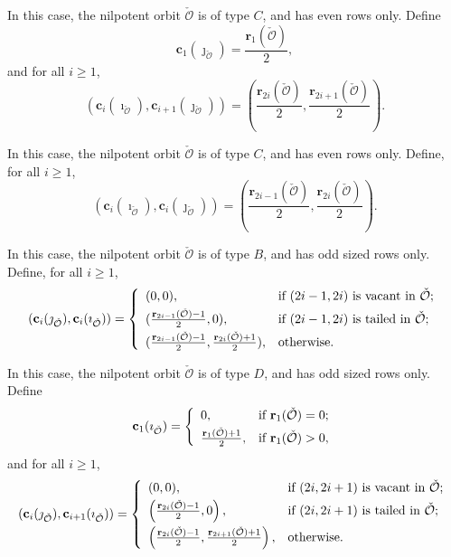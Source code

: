 \documentclass[11pt,a4paper]{amsart}
\newcommand{\CO}{{\mathcal {O}}}
\numberwithin{equation}{section}
\theoremstyle{remark}
\begin{document}
\medskip

 In this case, the nilpotent orbit $\check \CO$ is of type $C$, and has even rows
  only. Define
 \[
   \mathbf c_{1}(\jmath_{\check \CO})=\frac{\mathbf r_1(\check \CO)}{2},
\]
and for all $i\geq 1$,
\[
\left (\mathbf c_{i}(\imath_{\check \CO}), \mathbf c_{i+1}(\jmath_{\check \CO})\right )=
            \left (\frac{\mathbf r_{2i}(\check \CO)}{2},  \frac{\mathbf r_{2i+1}(\check \CO)}{2}\right ).
\]

\medskip

 In
this case, the nilpotent
orbit $\check \CO$ is of type $C$, and has even rows only. Define, for all $i\geq 1$,
\[
(\mathbf c_{i}(\imath_{\check \CO}), \mathbf c_{i}(\jmath_{\check \CO}))=
           \left (\frac{\mathbf r_{2i-1}(\check \CO)}{2},  \frac{\mathbf r_{2i}(\check \CO)}{2}\right).
\]

\medskip

 In this case, the nilpotent orbit $\check \CO$ is of type $B$, and has odd sized  rows only. Define, for all
$i\geq 1$,
\[
(\mathbf c_{i}(\jmath_{\check \CO}), \mathbf c_{i}(\imath_{\check \CO}))=
   \left\{
     \begin{array}{ll}
        (0,  0), &\hbox{if $(2i-1, 2i)$ is vacant  in $\check \CO$};\smallskip\\
        (\frac{\mathbf r_{2i-1}(\check \CO)-1}{2},  0), & \hbox{if $(2i-1, 2i)$ is tailed in $\check \CO$};\smallskip\\
                  (\frac{\mathbf r_{2i-1}(\check \CO)-1}{2},  \frac{\mathbf r_{2i}(\check \CO)+1}{2}), &\hbox{otherwise}.\\
            \end{array}
   \right.
\]
\medskip

 In this case, the nilpotent orbit $\check \CO$ is of type $D$, and has odd sized rows only. Define
 \[
   \mathbf c_{1}(\imath_{\check \CO})= \left\{
     \begin{array}{ll}
      0,  &\hbox{if $\mathbf r_1(\check \CO)=0$}; \smallskip\\
       \frac{\mathbf r_1(\check \CO)+1}{2},   &\hbox{if $\mathbf r_1(\check \CO)>0$},\\
            \end{array}
   \right.
 \]
and for all $i\geq 1$,
\[
(\mathbf c_{i}(\jmath_{\check \CO}), \mathbf c_{i+1}(\imath_{\check \CO}))=
   \left\{
     \begin{array}{ll}
        (0,  0), &\hbox{if $(2i, 2i+1)$ is vacant in $\check \CO$};\smallskip\\
      \left  (\frac{\mathbf r_{2i}(\check \CO)-1}{2},  0\right ), & \hbox{if $(2i, 2i+1)$ is tailed in $\check \CO$};\smallskip\\
                \left  (\frac{\mathbf r_{2i}(\check \CO)-1}{2},  \frac{\mathbf r_{2i+1}(\check \CO)+1}{2}\right ), &\hbox{otherwise}.\\
            \end{array}
   \right.
\]
\end{document}

